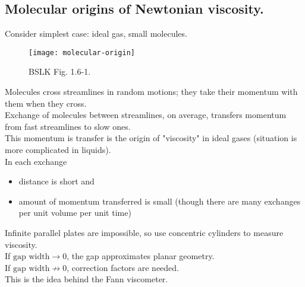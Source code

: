 \subsection{Molecular origins of Newtonian viscosity.}
Consider simplest case: ideal gas, small molecules.
\begin{figure}[H]
	\centering
	\texttt{[image: molecular-origin]}
	\caption{BSLK Fig. 1.6-1.}
\end{figure}
Molecules cross streamlines in random motions; they take their momentum with them when they cross.\\
Exchange of molecules between streamlines, on average, transfers momentum from fast streamlines to slow ones.\\
This momentum is transfer is the origin of "viscosity" in ideal gases (situation is more complicated in liquids).\\
In each exchange
\begin{itemize}
	\item distance is short and
	\item amount of momentum transferred is small (though there are many exchanges per unit volume per unit time)
\end{itemize}
Infinite parallel plates are impossible, so use concentric cylinders to measure viscosity.\\
If $\text{gap width}\to0$, the gap approximates planar geometry.\\
If $\text{gap width}\not\to0$, correction factors are needed.\\
This is the idea behind the Fann viscometer.

